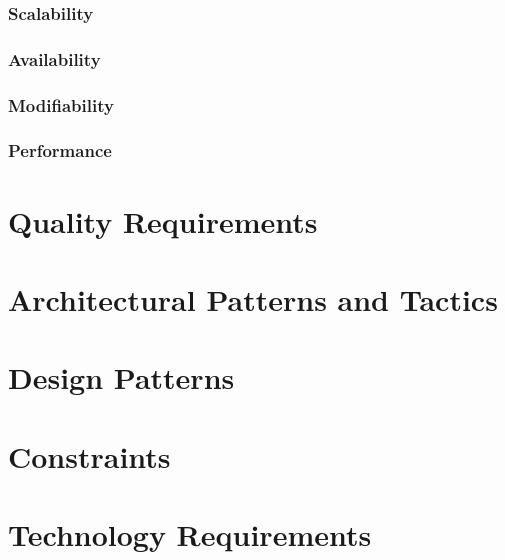 \documentclass[12pt]{article}
\begin{document}
\subsubsection*{Scalability}

\subsubsection*{Availability}

\subsubsection*{Modifiability}

\subsubsection*{Performance}




\newpage

\section{Quality Requirements}

\newpage

\section{Architectural Patterns and Tactics}

\newpage

\section{Design Patterns}

\newpage

\section{Constraints}

\newpage

\section{Technology Requirements}

\newpage
\end{document}

